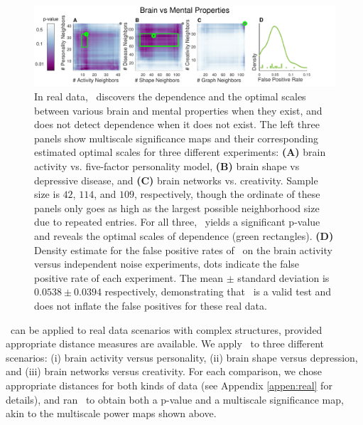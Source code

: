 \documentclass[11pt]{article}
\begin{document}
\begin{figure}[!ht]
\includegraphics[width=1.0\textwidth,trim={0 0 1.5cm 0},clip]{Figures/FigReal}
\caption{In real data, \Mgc~discovers the dependence and the optimal scales between various brain and mental properties when they exist, and does not detect dependence when it does not exist.  The left three panels show multiscale significance maps and their corresponding estimated optimal scales for three different experiments: \textbf{(A)}  brain activity vs. five-factor personality model, \textbf{(B)}  brain shape vs depressive disease, and \textbf{(C)} brain networks vs. creativity. Sample size is $42$, $114$, and $109$, respectively, though the ordinate of these panels only goes as high as the largest possible neighborhood size due to repeated entries.  
For all three, \Mgc~yields a significant p-value and reveals the optimal scales of dependence (green rectangles).
\textbf{(D)} Density estimate for the false positive rates of  \Mgc~on the brain activity versus  independent noise experiments, dots indicate the false positive rate of each experiment. The mean $\pm$ standard deviation is $0.0538 \pm 0.0394$ respectively, demonstrating that \Mgc~is a valid test and does not inflate the false positives for these real data.}
\label{f:real}
\end{figure}

\Mgc~can be applied to real data scenarios with complex structures, provided appropriate distance measures are available. We apply \Mgc~to three different scenarios: (i) brain activity versus personality, (ii) brain shape versus depression, and (iii) brain networks versus creativity.  For each comparison, we chose appropriate distances for both kinds of data (see Appendix \ref{appen:real} for details), and ran \Mgc~to obtain both a p-value and a multiscale significance map, akin to the multiscale power maps shown above. 
\end{document}

